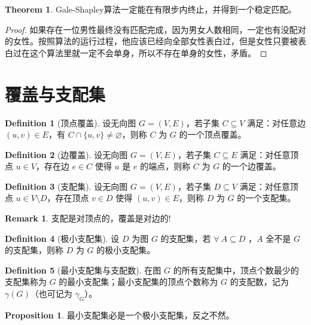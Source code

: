 \documentclass[oneside]{book}
\theoremstyle{definition}
\newtheorem{proposition}{Proposition}[section]
\newtheorem{definition}{Definition}[section]
\newtheorem{theorem}{Theorem}[section]
\newtheorem{remark}{Remark}[section]
\begin{document}
\begin{theorem}
	Gale-Shapley算法一定能在有限步内终止，并得到一个稳定匹配。
\end{theorem}

\begin{proof}
	如果存在一位男性最终没有匹配完成，因为男女人数相同，一定也有没配对的女性。按照算法的运行过程，他应该已经向全部女性表白过，但是女性只要被表白过在这个算法里就一定不会单身，所以不存在单身的女性，矛盾。
\end{proof}
	\section{覆盖与支配集}

\begin{definition}[顶点覆盖]
	设无向图 \( G = (V, E) \)，若子集 \( C \subseteq V \) 满足：对任意边 \( (u, v) \in E \)，有 \( C \cap \{u, v\} \neq \varnothing \)，则称 \( C \) 为 \( G \) 的一个顶点覆盖。
\end{definition}

\begin{definition}[边覆盖]
	设无向图 \( G = (V, E) \)，若子集 \( C \subseteq E \) 满足：对任意顶点 \( u \in V \)，存在边 \( e \in C \) 使得 \( u \) 是 \( e \) 的端点，则称 \( C \) 为 \( G \) 的一个边覆盖。
\end{definition}

\begin{definition}[支配集]
	设无向图 \( G = (V, E) \)，若子集 \( D \subseteq V \) 满足：对任意顶点 \( u \in V \setminus D \)，存在顶点 \( v \in D \) 使得 \( (u, v) \in E \)，则称 \( D \) 为 \( G \) 的一个支配集。
\end{definition}
\begin{remark}
	支配是对顶点的，覆盖是对边的!
\end{remark}
\begin{definition}[极小支配集]
	设 \( D \) 为图 \( G \) 的支配集，若 \(\forall \ A\subseteq D \) ，\(A\) 全不是 \(G\) 的支配集，则称 \( D \) 为 \( G \) 的极小支配集。
\end{definition}

\begin{definition}[最小支配集与支配数]
	在图 \( G \) 的所有支配集中，顶点个数最少的支配集称为 \( G \) 的最小支配集；最小支配集的顶点个数称为 \( G \) 的支配数，记为 \( \gamma(G) \)（也可记为 \( \gamma_G \)）。
\end{definition}
	\begin{proposition}
	最小支配集必是一个极小支配集，反之不然。
\end{proposition}
\end{document}
